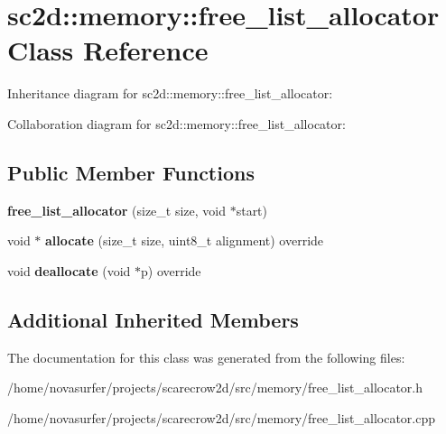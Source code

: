 \hypertarget{classsc2d_1_1memory_1_1free__list__allocator}{}\section{sc2d\+:\+:memory\+:\+:free\+\_\+list\+\_\+allocator Class Reference}
\label{classsc2d_1_1memory_1_1free__list__allocator}


Inheritance diagram for sc2d\+:\+:memory\+:\+:free\+\_\+list\+\_\+allocator\+:


Collaboration diagram for sc2d\+:\+:memory\+:\+:free\+\_\+list\+\_\+allocator\+:
\subsection*{Public Member Functions}
\begin{DoxyCompactItemize}
\item 
\mbox{\label{classsc2d_1_1memory_1_1free__list__allocator_a4728d4e67a357edcbe00d3416864a57b}} 
{\bfseries free\+\_\+list\+\_\+allocator} (size\+\_\+t size, void $\ast$start)
\item 
\mbox{\label{classsc2d_1_1memory_1_1free__list__allocator_a66af769394bcbebf67002d5c0ddcfe9b}} 
void $\ast$ {\bfseries allocate} (size\+\_\+t size, uint8\+\_\+t alignment) override
\item 
\mbox{\label{classsc2d_1_1memory_1_1free__list__allocator_ade0842119e9583d8c322653dadb417b9}} 
void {\bfseries deallocate} (void $\ast$p) override
\end{DoxyCompactItemize}
\subsection*{Additional Inherited Members}


The documentation for this class was generated from the following files\+:\begin{DoxyCompactItemize}
\item 
/home/novasurfer/projects/scarecrow2d/src/memory/free\+\_\+list\+\_\+allocator.\+h\item 
/home/novasurfer/projects/scarecrow2d/src/memory/free\+\_\+list\+\_\+allocator.\+cpp\end{DoxyCompactItemize}
